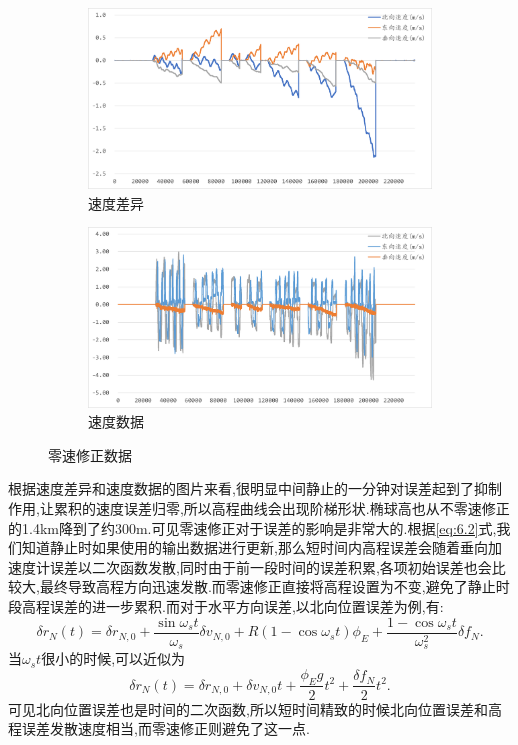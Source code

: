 \documentclass[10pt,a4paper]{ctexart}
\begin{document}
\begin{figure}[H]
{        \begin{subfigure}{0.49\textwidth}
            \centering
            \includegraphics[width=\linewidth]{Figures/DataFigure/灵素修正速度差异.png}
            \caption*{速度差异}
        \end{subfigure}\hfill
        \begin{subfigure}{0.49\textwidth}
            \centering
            \includegraphics[width=\linewidth]{Figures/DataFigure/灵素修正速度.png}
            \caption*{速度数据}
        \end{subfigure}
    }
    \caption{零速修正数据}
    \label{fig:6.5}
\end{figure}
\noindent 根据速度差异和速度数据的图片来看,很明显中间静止的一分钟对误差起到了抑制作用,让累积的速度误差归零,所以高程曲线会出现阶梯形状.椭球高也从不零速修正的1.4km降到了约300m.可见零速修正对于误差的影响是非常大的.根据\eqref{eq:6.2}式,我们知道静止时如果使用\IMU 的输出数据进行更新,那么短时间内高程误差会随着垂向加速度计误差以二次函数发散,同时由于前一段时间的误差积累,各项初始误差也会比较大,最终导致高程方向迅速发散.而零速修正直接将高程设置为不变,避免了静止时段高程误差的进一步累积.而对于水平方向误差,以北向位置误差为例,有:
\begin{equation}\label{eq:6.3}
    \delta r_N(t) =\delta r_{N,0} + \frac{\sin \omega_s t}{\omega_s} \delta v_{N,0} + R(1 - \cos \omega_s t)\phi_E + \frac{1 - \cos \omega_s t}{\omega_s^2} \delta f_N.
\end{equation}
当$\omega_s t$很小的时候,可以近似为
\begin{equation}\label{eq:6.4}
    \delta r_N(t) =\delta r_{N,0} +\delta v_{N,0} t + \frac{\phi_E g}{2}t^2 + \frac{\delta f_N}{2}t^2.
\end{equation}
可见北向位置误差也是时间的二次函数,所以短时间精致的时候北向位置误差和高程误差发散速度相当,而零速修正则避免了这一点.
\end{document}

